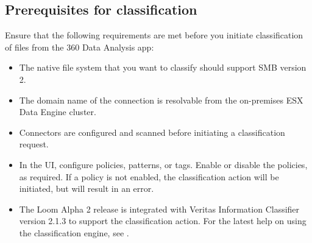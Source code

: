 \documentclass[letterpaper,10pt,english]{sphinxmanual}
\begin{document}
\subsection{Prerequisites for classification}
\label{\detokenize{mcdmp_app_ug:prerequisites-for-classification}}
Ensure that the following requirements are met before you initiate classification of files from the 360 Data Analysis app:
\begin{itemize}
\item {} 
The native file system that you want to classify should support SMB version 2.

\item {} 
The domain name of the connection is resolvable from the on-premises ESX Data Engine cluster.

\item {} 
Connectors are configured and scanned before initiating a classification request.

\item {} 
In the  UI, configure policies, patterns, or tags. Enable or disable the policies, as required. If a policy is not enabled, the classification action will be initiated, but will result in an error.

\item {} 
The Loom Alpha 2 release is integrated with Veritas Information Classifier version 2.1.3 to support the classification action. For the latest help on using the classification engine, see .

\end{itemize}
\end{document}
